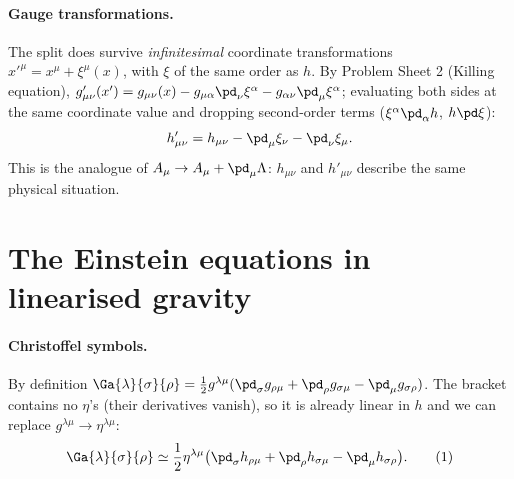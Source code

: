 \paragraph{Gauge transformations.} The split does survive \emph{infinitesimal} coordinate transformations $x'^\mu=x^\mu+\xi^\mu(x)$, with $\xi$ of the same order as $h$. By Problem Sheet 2 (Killing equation), $g'_{\mu\nu}(x')=g_{\mu\nu}(x)-g_{\mu\alpha}\pd_\nu\xi^\alpha-g_{\alpha\nu}\pd_\mu\xi^\alpha$; evaluating both sides at the same coordinate value and dropping second-order terms ($\xi^\alpha\pd_\alpha h$, $h\pd\xi$):
\begin{equation}
  h'_{\mu\nu}=h_{\mu\nu}-\pd_\mu\xi_\nu-\pd_\nu\xi_\mu .
  \label{eq:gauge-h}
\end{equation}
This is the analogue of $A_\mu\to A_\mu+\pd_\mu\Lambda$: $h_{\mu\nu}$ and $h'_{\mu\nu}$ describe the same physical situation.

\section{The Einstein equations in linearised gravity}

\paragraph{Christoffel symbols.} By definition $\Ga{\lambda}{\sigma}{\rho}=\frac12g^{\lambda\mu}(\pd_\sigma g_{\rho\mu}+\pd_\rho g_{\sigma\mu}-\pd_\mu g_{\sigma\rho})$. The bracket contains no $\eta$'s (their derivatives vanish), so it is already linear in $h$ and we can replace $g^{\lambda\mu}\to\eta^{\lambda\mu}$:
\begin{equation}
  \Ga{\lambda}{\sigma}{\rho}\simeq\frac12\eta^{\lambda\mu}\big(\pd_\sigma h_{\rho\mu}+\pd_\rho h_{\sigma\mu}-\pd_\mu h_{\sigma\rho}\big).\tag{1}
\end{equation}
